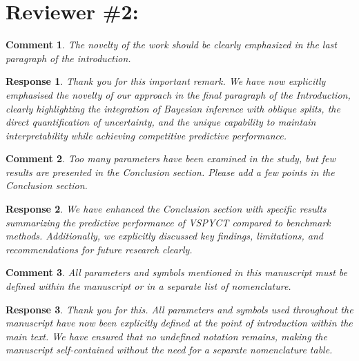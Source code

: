 \documentclass [a4paper,11pt]{article}
\theoremstyle{blue}
\newtheorem{question}{Comment}[section]
\theoremstyle{blue}
\theoremstyle{note}
\newtheorem{answer}{Response}[section]
\theoremstyle{note}
\begin{document}
	\section{Reviewer \#2:}
	
	
\begin{question}

The novelty of the work should be clearly emphasized in the last paragraph of the introduction.

\end{question}

\begin{answer}

Thank you for this important remark. We have now explicitly emphasised the novelty of our approach in the final paragraph of the Introduction, clearly highlighting the integration of Bayesian inference with oblique splits, the direct quantification of uncertainty, and the unique capability to maintain interpretability while achieving competitive predictive performance.

\end{answer}

\begin{question}

Too many parameters have been examined in the study, but few results are presented in the Conclusion section. Please add a few points in the Conclusion section.

\end{question}

\begin{answer}

We have enhanced the Conclusion section with specific results summarizing the predictive performance of VSPYCT compared to benchmark methods. Additionally, we explicitly discussed key findings, limitations, and recommendations for future research clearly.

\end{answer}

\begin{question}

All parameters and symbols mentioned in this manuscript must be defined within the manuscript or in a separate list of nomenclature.

\end{question}

\begin{answer}

Thank you for this. All parameters and symbols used throughout the manuscript have now been explicitly defined at the point of introduction within the main text. We have ensured that no undefined notation remains, making the manuscript self-contained without the need for a separate nomenclature table.

\end{answer}
\end{document}
